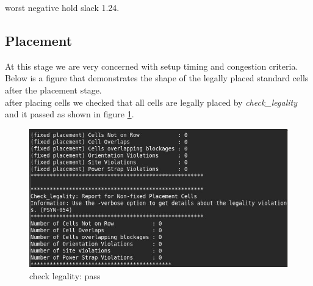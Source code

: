 \documentclass[../main.tex]{subfiles}
\begin{document}
 \newline worst negative hold slack 1.24.
\subsection{Placement} 
At
this stage we are very concerned with setup timing and congestion criteria. Below is a figure that
demonstrates the shape of the legally placed standard cells after the placement stage.\\
after placing cells we checked that all cells are legally placed by \textit{check\_legality} and it passed as shown in figure \ref{fig:checklegality}.

\begin{figure}[h]
    \centering
    \includegraphics[width=12cm]{diagrams/checklegality.JPG}
    \caption{check legality: pass}
    \label{fig:checklegality}
\end{figure}
\end{document}
